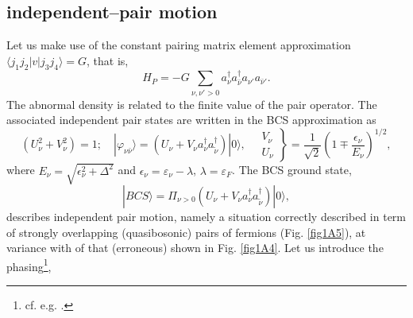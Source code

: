 \subsection{independent--pair motion}\label{C1AppDS2}
Let us make use of the constant pairing matrix element approximation $\langle j_1j_2|v|j_3j_4\rangle=G$, that is, 
\begin{equation}
H_P=-G\sum_{\nu, \nu'>0}a^{\dagger}_\nu a^{\dagger}_{\bar\nu}a_{\nu'} a_{\bar\nu'}.
\end{equation}
 The abnormal density is related to the finite value of the pair operator. The associated independent pair states are written in the BCS approximation as
\begin{equation}
\left(U_\nu^2+V_\nu^2\right)=1;\quad |\varphi_{\nu\bar\nu}\rangle=\left(U_\nu+V_\nu  a^\dagger_{\nu}a^\dagger_{\tilde{\nu}}\right)|0\rangle,\quad\left.\begin{array}{c}
V_\nu \\ 
U_\nu
\end{array}\right\}=\frac{1}{\sqrt{2}}\left(1\mp\frac{\epsilon_\nu}{E_\nu}\right)^{1/2},
\end{equation}
where $E_\nu=\sqrt{\epsilon_\nu^2+\Delta^2}$ and $\epsilon_\nu=\varepsilon_\nu-\lambda$, $\lambda=\varepsilon_F$.
The BCS ground state,
\begin{equation}
|BCS\rangle=\Pi_{\nu>0}\left(U_\nu+V_\nu a^\dagger_{\nu}a^\dagger_{\tilde{\nu}}\right)|0\rangle,
\end{equation}
describes independent pair motion, namely a situation correctly described in term of strongly overlapping (quasibosonic) pairs of fermions (Fig. \ref{fig1A5}), at variance with of that (erroneous) shown in Fig. \ref{fig1A4}.
Let us introduce the phasing\footnote{cf. e.g. \cite{Schrieffer:73}.}, 

